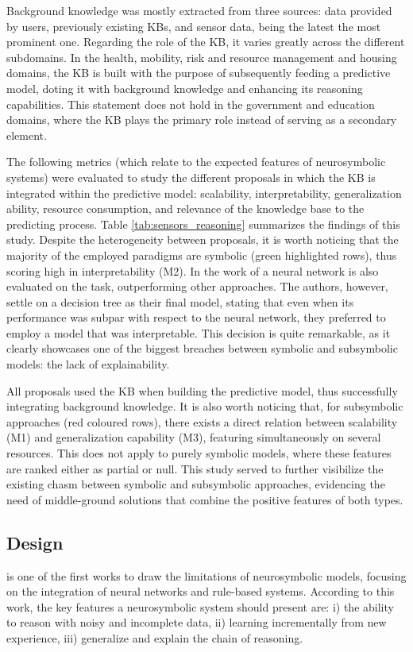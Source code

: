 Background knowledge was mostly extracted from three sources: data provided by users, previously existing KBs, and sensor data, being the latest the most prominent one. Regarding the role of the KB, it varies greatly across the different subdomains. In the health, mobility, risk and resource management and housing domains, the KB is built with the purpose of subsequently feeding a predictive model, doting it with background knowledge and enhancing its reasoning capabilities. This statement does not hold in the government and education domains, where the KB plays the primary role instead of serving as a secondary element.

The following metrics (which relate to the expected features of neurosymbolic systems) were evaluated to study the different proposals in which the KB is integrated within the predictive model: scalability, interpretability, generalization ability, resource consumption, and relevance of the knowledge base to the predicting process. Table \ref{tab:sensors_reasoning} summarizes the findings of this study. Despite the heterogeneity between proposals, it is worth noticing that the majority of the employed paradigms are symbolic (green highlighted rows), thus scoring high in interpretability (M2). In the work of \cite{olszewskiturek} a neural network is also evaluated on the task, outperforming other approaches. The authors, however, settle on a decision tree as their final model, stating that even when its performance was subpar with respect to the neural network, they preferred to employ a model that was interpretable. This decision is quite remarkable, as it clearly showcases one of the biggest breaches between symbolic and subsymbolic models: the lack of explainability. 

All proposals used the KB when building the predictive model, thus successfully integrating background knowledge. It is also worth noticing that, for subsymbolic approaches (red coloured rows), there exists a direct relation between scalability (M1) and generalization capability (M3), featuring simultaneously on several resources. This does not apply to purely symbolic models, where these features are ranked either as partial or null. This study served to further visibilize the existing chasm between symbolic and subsymbolic approaches, evidencing the need of middle-ground solutions that combine the positive features of both types.


\subsection{Design}\label{2_sec:subsec:design}
\cite{mcgarry_hybrid_1999} is one of the first works to draw the limitations of neurosymbolic models, focusing on the integration of neural networks and rule-based systems. According to this work, the key features a neurosymbolic system should present are: i) the ability to reason with noisy and incomplete data, ii) learning incrementally from new experience, iii) generalize and explain the chain of reasoning. %

